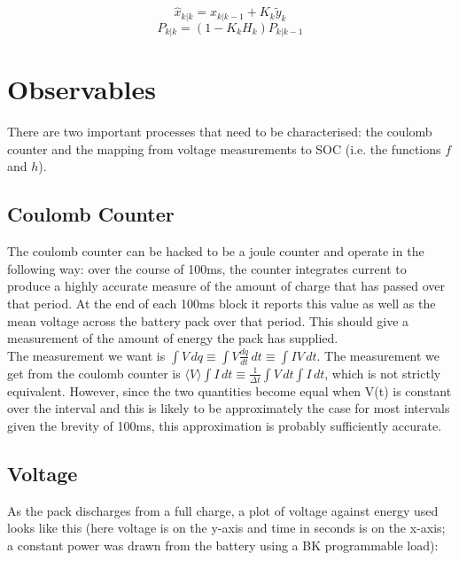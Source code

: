\documentclass[letterpaper,12pt]{article} %
\begin{document}
\begin{equation}
\hat{x}_{k|k} = \hat{x}_{k|k-1} + K_k\tilde{y}_k
\end{equation}
\begin{equation}
P_{k|k} = (1 - K_k H_k) P_{k|k-1}
\end{equation}

\section{Observables}

There are two important processes that need to be characterised: the coulomb counter and the mapping from voltage measurements to SOC (i.e. the functions $f$ and $h$).

\subsection{Coulomb Counter}

The coulomb counter can be hacked to be a joule counter and operate in the following way: over the course of 100ms, the counter integrates current to produce a highly accurate measure of the amount of charge that has passed over that period. At the end of each 100ms block it reports this value as well as the mean voltage across the battery pack over that period. This should give a measurement of the amount of energy the pack has supplied.\\

The measurement we want is $ \int V \, dq \equiv \int V  \frac {dq} {dt} \, dt \equiv \int I V \, dt $. The measurement we get from the coulomb counter is $ \langle V \rangle \int I \, dt \equiv  \frac { 1 }{ \Delta t } \int V \, dt \int I \, dt $, which is not strictly equivalent. However, since the two quantities become equal when V(t) is constant over the interval and this is likely to be approximately the case for most intervals given the brevity of 100ms, this approximation is probably sufficiently accurate.

\subsection{Voltage}

As the pack discharges from a full charge, a plot of voltage against energy used looks like this (here voltage is on the y-axis and time in seconds is on the x-axis; a constant power was drawn from the battery using a BK programmable load):\\
\end{document}
